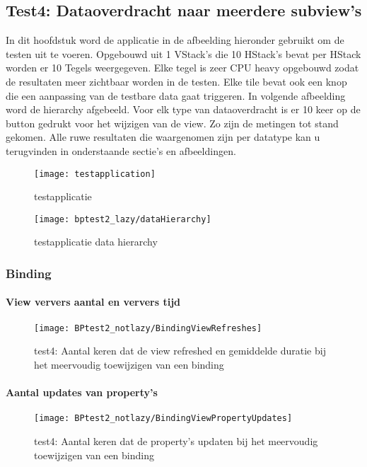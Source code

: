 \subsection{Test4: Dataoverdracht naar meerdere subview's}
In dit hoofdstuk word de applicatie in de afbeelding hieronder gebruikt om de testen uit te voeren. Opgebouwd uit 1 VStack's die 10 HStack's bevat per HStack worden er 10 Tegels weergegeven. Elke tegel is zeer CPU heavy opgebouwd zodat de resultaten meer zichtbaar worden in de testen. Elke tile bevat ook een knop die een aanpassing van de testbare data gaat triggeren. In volgende afbeelding word de hierarchy afgebeeld. Voor elk type van dataoverdracht is er 10 keer op de button gedrukt voor het wijzigen van de view. Zo zijn de metingen tot stand gekomen. Alle ruwe resultaten die waargenomen zijn per datatype kan u terugvinden in onderstaande sectie's en afbeeldingen.
\begin{figure}[htbp]
    \centering
    \texttt{[image: testapplication]} 
    \caption{testapplicatie}
    \label{fig:testapplication3}
\end{figure}
\begin{figure}[htbp]
    \centering
    \texttt{[image: bptest2\_lazy/dataHierarchy]} 
    \caption{testapplicatie data hierarchy}
    \label{fig:testapplicationHierarchy3}
\end{figure}
\subsubsection{Binding}
\paragraph{View ververs aantal en ververs tijd}
\begin{figure}[H]
    \centering
    \texttt{[image: BPtest2\_notlazy/BindingViewRefreshes]} 
    \caption{test4: Aantal keren dat de view refreshed en gemiddelde duratie bij het meervoudig toewijzigen van een binding}
    \label{fig:viewRefreshesBinding3}
\end{figure}
\paragraph{Aantal updates van property's}
\begin{figure}[H]
    \centering
    \texttt{[image: BPtest2\_notlazy/BindingViewPropertyUpdates]} 
    \caption{test4: Aantal keren dat de property's updaten bij het meervoudig toewijzigen van een binding}
    \label{fig:propertyUpdatesBinding3}
\end{figure}
